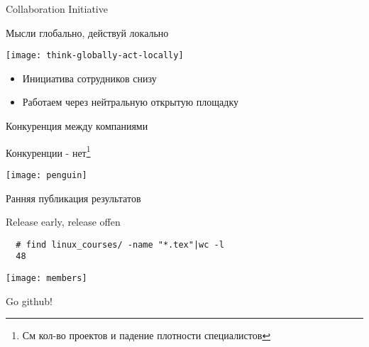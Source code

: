 \begin{frame}{Collaboration Initiative}

  \begin{center}
    Мысли глобально, действуй локально

    \texttt{[image: think-globally-act-locally]}

    \begin{itemize}
      \item Инициатива сотрудников снизу
      \item Работаем через нейтральную открытую площадку
    \end{itemize}

  \end{center}

\end{frame}

\begin{frame}{Конкуренция между компаниями}
      
  \center\Large\alert{Конкуренции - нет}\footnote{См кол-во проектов и падение плотности специалистов}

  \center\texttt{[image: penguin]}

\end{frame}


\begin{frame}[fragile]{Ранняя публикация результатов}

  \begin{center}
    \alert{Release early, release offen} 

\begin{lstlisting}
  # find linux_courses/ -name "*.tex"|wc -l
  48
\end{lstlisting}

    \texttt{[image: members]}

    \alert{Go github!}
  \end{center}
  
\end{frame}

